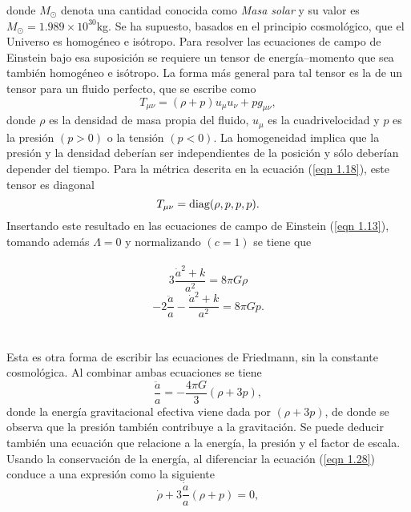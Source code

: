 \documentclass[a4paper,openright,12pt]{book}
\begin{document}
donde $M_{\odot}$ denota una cantidad conocida como \textit{Masa solar} y su valor es $M_{\odot} = 1.989 \times 10^{30}$kg. Se ha supuesto, basados en el principio cosmológico, que el Universo es homogéneo e isótropo. Para resolver las ecuaciones de campo de Einstein bajo esa suposición se requiere un tensor de energía--momento que sea también homogéneo e isótropo. La forma más general para tal tensor es la de un tensor para un fluido perfecto, que se escribe como \cite{1.2, 1.3}
\begin{equation}
T_{\mu \nu} =
(\rho + p)u_{\mu}u_{\nu} + pg_{\mu \nu},\label{eqn 1.26}
\end{equation}
donde $\rho$ es la densidad de masa propia del fluido, $u_{\mu}$ es la cuadrivelocidad y $p$ es la presión $(p > 0)$ o la tensión $(p < 0)$. La homogeneidad implica que la presión y la densidad deberían ser independientes de la posición y sólo deberían depender del tiempo. Para la métrica descrita en la ecuación (\ref{eqn 1.18}), este tensor es diagonal 
\begin{equation}
T_{\mu \nu} = \textup{diag}(\rho, p, p, p).\label{eqn 1.27}
\end{equation}
Insertando este resultado en las ecuaciones de campo de Einstein (\ref{eqn 1.13}), tomando además $\Lambda = 0$ y normalizando $(c = 1)$ se tiene que\\\\
\begin{equation*}
 3\frac{\dot{a}^{2} + k}{a^{2}}  = 8 \pi G \rho
 \end{equation*}
\begin{equation} 
-2\frac{\ddot{a}}{a} - \frac{\dot{a}^{2} + k}{a^{2}}= 8 \pi G p.\label{eqn 1.28}
\end{equation}\\\\
Esta es otra forma de escribir las ecuaciones de Friedmann, sin la constante cosmológica. Al combinar ambas ecuaciones se tiene
\begin{equation}
\frac{\ddot{a}}{a} = -\frac{4 \pi G}{3}(\rho + 3p), \label{eqn 1.29}
\end{equation}
donde la energía gravitacional efectiva viene dada por $(\rho + 3p)$, de donde se observa que la presión también contribuye a la gravitación. Se puede deducir también una ecuación que relacione a la energía, la presión y el factor de escala. Usando la conservación de la energía, al diferenciar la ecuación (\ref{eqn 1.28}) conduce a una expresión como la siguiente
\begin{equation}
\dot{\rho} + 3\frac{\dot{a}}{a}(\rho + p) = 0,\label{eqn 1.30}
\end{equation}
\end{document}
